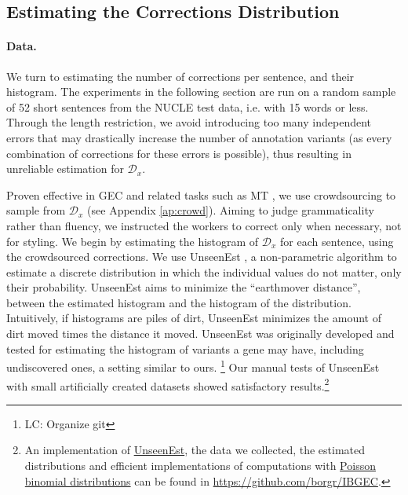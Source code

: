 \documentclass[11pt, a4paper]{article}
\newcommand{\lc}[1]{\footnote{\color{blue}LC: #1}}
\begin{document}
\subsection{Estimating the Corrections Distribution}\label{subsec:corrections_distribution}
%
\paragraph{Data.}
We turn to estimating the number of corrections per sentence, and their histogram.
The experiments in the following section are run on a random sample of 52 short sentences from the NUCLE test data, i.e. with 15 words or less. Through the length restriction, we avoid introducing too many independent errors that may drastically increase the number of annotation variants (as every combination of corrections for these errors is possible), thus resulting in unreliable estimation for $\mathcal{D}_x$. 

Proven effective in GEC and related tasks such as MT \cite{zaidan2011crowdsourcing,madnani2011they,post2012constructing}, 
we use crowdsourcing to sample from $\mathcal{D}_x$ (see Appendix  \ref{ap:crowd}).
Aiming to judge grammaticality rather than fluency, we instructed the workers to correct only when necessary, not for styling.
We begin by estimating the histogram of $\mathcal{D}_x$ for each sentence, using the crowdsourced corrections.
We use {\sc UnseenEst} \cite{zou2015quantifying}, a non-parametric algorithm to
estimate a discrete distribution in which the individual values do not matter, only their probability. 
{\sc UnseenEst} aims to minimize the ``earthmover distance'', between the estimated histogram and the histogram of the distribution. 
Intuitively, if histograms are piles of dirt, {\sc UnseenEst} minimizes the amount of dirt moved times the distance it moved.
{\sc UnseenEst} was originally developed and tested for estimating the histogram of
variants a gene may have, including undiscovered ones, a setting similar to ours.
\lc{Organize git}
Our manual tests of {\sc UnseenEst} with small artificially created datasets
showed satisfactory results.\footnote{An implementation of \href{https://github.com/borgr/unseenest}{\sc UnseenEst}, the data we collected, the estimated distributions and efficient implementations of computations with \href{https://github.com/borgr/PoissonBinomial}{Poisson binomial distributions} can be found in \url{https://github.com/borgr/IBGEC}.}
\end{document}
